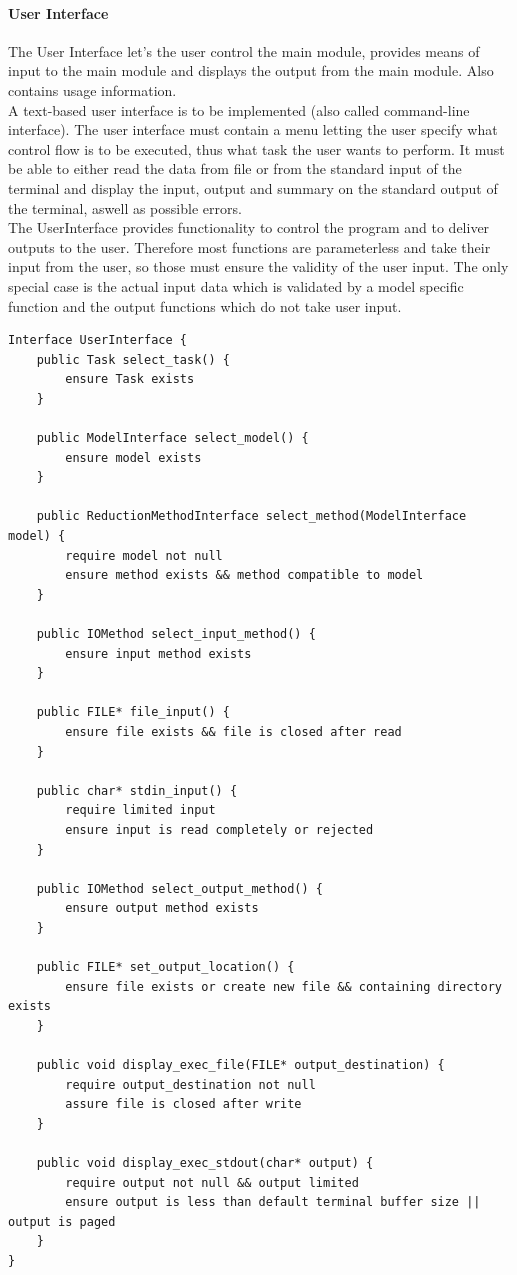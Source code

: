 			\paragraph{User Interface}
				The User Interface let's the user control the main module, provides means of input to the main module and displays the output from the main module. Also contains usage information. \\
				A text-based user interface is to be implemented (also called command-line interface). The user interface must contain a menu letting the user specify what control flow is to be executed, thus what task the user wants to perform. It must be able to either read the data from file or from the standard input of the terminal and display the input, output and summary on the standard output of the terminal, aswell as possible errors. \\
				The UserInterface provides functionality to control the program and to deliver outputs to the user. Therefore most functions are parameterless and take their input from the user, so those must ensure the validity of the user input. The only special case is the actual input data which is validated by a model specific function and the output functions which do not take user input. \\
\begin{verbatim}
Interface UserInterface {
    public Task select_task() {
        ensure Task exists
    }

    public ModelInterface select_model() {
        ensure model exists
    }
    
    public ReductionMethodInterface select_method(ModelInterface model) {
        require model not null
        ensure method exists && method compatible to model
    }
    
    public IOMethod select_input_method() {
        ensure input method exists
    }
    
    public FILE* file_input() {
        ensure file exists && file is closed after read
    }
    
    public char* stdin_input() {
        require limited input
        ensure input is read completely or rejected
    }
    
    public IOMethod select_output_method() {
        ensure output method exists
    }
    
    public FILE* set_output_location() {
        ensure file exists or create new file && containing directory exists
    }
    
    public void display_exec_file(FILE* output_destination) {
        require output_destination not null
        assure file is closed after write
    }
    
    public void display_exec_stdout(char* output) {
        require output not null && output limited
        ensure output is less than default terminal buffer size || output is paged
    }
}
\end{verbatim}				
			
